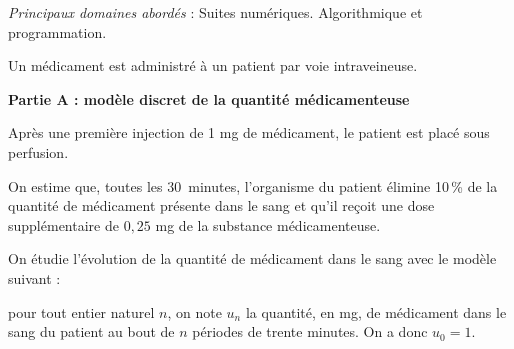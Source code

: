 \medskip

\emph{Principaux domaines abordés} : Suites numériques. Algorithmique et programmation.

\medskip

Un médicament est administré à un patient par voie intraveineuse. 

\bigskip

\textbf{Partie A : modèle discret de la quantité médicamenteuse}

\medskip

Après une première injection de 1 mg de médicament, le patient est placé sous perfusion.

On estime que, toutes les $30$~minutes, l'organisme du patient élimine 10\,\% de la quantité de médicament présente dans le sang et qu'il reçoit une dose supplémentaire de $0,25$ mg de la substance médicamenteuse.

On étudie l'évolution de la quantité de médicament dans le sang avec le modèle suivant :

pour tout entier naturel $n$, on note $u_n$ la quantité, en mg, de médicament dans le sang du patient au bout de $n$ périodes de trente minutes. On a donc $u_0 = 1$.

\medskip


